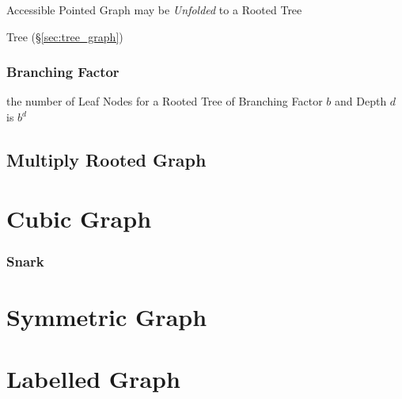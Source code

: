Accessible Pointed Graph may be \emph{Unfolded} to a Rooted Tree

Tree (\S\ref{sec:tree_graph})



\subsubsection{Branching Factor}\label{sec:branching_factor}

the number of Leaf Nodes for a Rooted Tree of Branching Factor $b$ and
Depth $d$ is $b^d$ %



\subsection{Multiply Rooted Graph}\label{sec:multiply_rooted}



\section{Cubic Graph}\label{sec:cubic_graph}

\subsubsection{Snark}\label{sec:snark}



\section{Symmetric Graph}\label{sec:symmetric_graph}

\section{Labelled Graph}\label{sec:labelled_graph}

